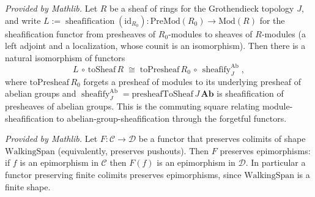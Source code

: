 \begin{lemma}
  \label{lem:sheafificationCompToSheaf_mathlib}
  \mathlibok
  \textit{Provided by Mathlib.}
  Let \(R\) be a sheaf of rings for the Grothendieck topology \(J\), and write
  \(L := \operatorname{sheafification}(\mathrm{id}_{R_0})
  : \mathrm{PreMod}(R_0) \to \mathrm{Mod}(R)\) for the sheafification functor from presheaves of
  \(R_0\)-modules to sheaves of \(R\)-modules (a left adjoint and a localization, whose counit is an
  isomorphism). Then there is a natural isomorphism of functors
  \[
    L \,\circ\, \mathrm{toSheaf}\,R \;\cong\;
    \mathrm{toPresheaf}\,R_0 \,\circ\, \operatorname{sheafify}_J^{\mathrm{Ab}},
  \]
  where \(\mathrm{toPresheaf}\,R_0\) forgets a presheaf of modules to its underlying presheaf of
  abelian groups and \(\operatorname{sheafify}_J^{\mathrm{Ab}} = \mathrm{presheafToSheaf}\,J\,
  \mathbf{Ab}\) is sheafification of presheaves of abelian groups. This is the commuting square
  relating module-sheafification to abelian-group-sheafification through the forgetful functors.
\end{lemma}

\begin{lemma}
  \label{lem:preservesEpi_of_preservesColimitsOfShape_mathlib}
  \mathlibok
  \textit{Provided by Mathlib.}
  Let \(F : \mathcal{C} \to \mathcal{D}\) be a functor that preserves colimits of shape
  \(\mathrm{WalkingSpan}\) (equivalently, preserves pushouts). Then \(F\) preserves epimorphisms: if
  \(f\) is an epimorphism in \(\mathcal{C}\) then \(F(f)\) is an epimorphism in \(\mathcal{D}\). In
  particular a functor preserving finite colimits preserves epimorphisms, since
  \(\mathrm{WalkingSpan}\) is a finite shape.
\end{lemma}

